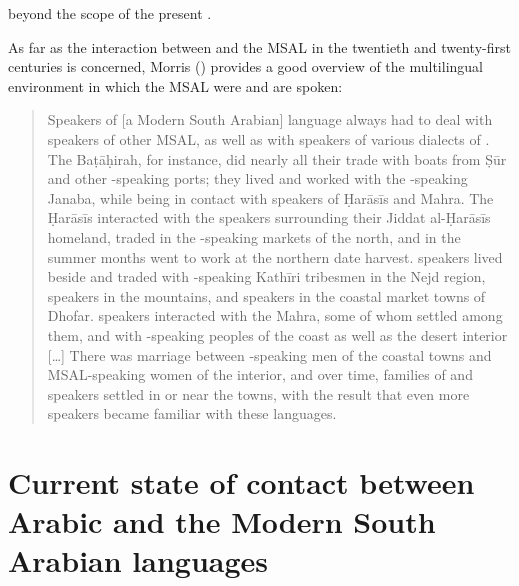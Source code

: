\documentclass[output=paper]{langsci/langscibook}
\begin{document}
beyond the scope of the present .

As far as the interaction between  and the MSAL in the twentieth and twenty-first centuries is concerned, Morris (\citeyear[25]{Morris2017}) provides a good overview of the multilingual environment in which the MSAL were and are spoken: 

\begin{quote}
Speakers of [a Modern South Arabian] language always had to deal with speakers of other MSAL, as well as with speakers of various dialects of . The Baṭāḥirah, for instance, did nearly all their trade with boats from Ṣūr and other -speaking ports; they lived and worked with the -speaking Janaba, while being in contact with speakers of Ḥarāsīs and Mahra. The Ḥarāsīs interacted with the  speakers surrounding their Jiddat al-Ḥarāsīs homeland, traded in the -speaking markets of the north, and in the summer months went to work at the northern date harvest.  speakers lived beside and traded with -speaking Kathīri tribesmen in the Nejd region,  speakers in the mountains, and  speakers in the coastal market towns of Dhofar.  speakers interacted with the Mahra, some of whom settled among them, and with -speaking peoples of the coast as well as the desert interior […] There was marriage between -speaking men of the coastal towns and MSAL-speaking women of the interior, and over time, families of  and  speakers settled in or near the towns, with the result that even more  speakers became familiar with these languages. \citep[25]{Morris2017}
\end{quote}

\section{Current state of contact between Arabic and the Modern South Arabian languages}\label{sec:2}
\end{document}
